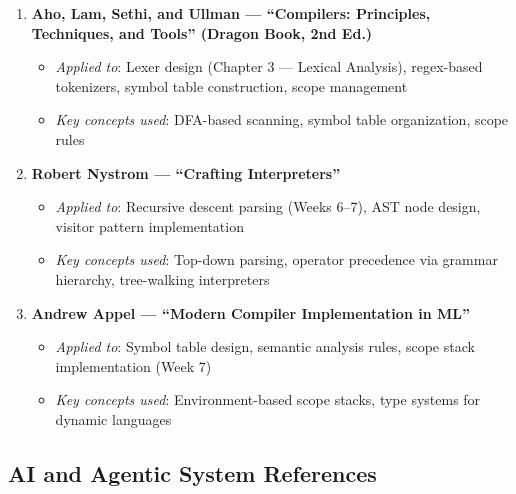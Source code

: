 \documentclass[a4paper,11pt]{article}
\begin{document}
\begin{enumerate}
    \item \textbf{Aho, Lam, Sethi, and Ullman --- ``Compilers: Principles, Techniques, and Tools'' (Dragon Book, 2nd Ed.)}
    \begin{itemize}
        \item \textit{Applied to}: Lexer design (Chapter 3 --- Lexical Analysis), regex-based tokenizers, symbol table construction, scope management
        \item \textit{Key concepts used}: DFA-based scanning, symbol table organization, scope rules
    \end{itemize}

    \item \textbf{Robert Nystrom --- ``Crafting Interpreters''}
    \begin{itemize}
        \item \textit{Applied to}: Recursive descent parsing (Weeks 6--7), AST node design, visitor pattern implementation
        \item \textit{Key concepts used}: Top-down parsing, operator precedence via grammar hierarchy, tree-walking interpreters
    \end{itemize}

    \item \textbf{Andrew Appel --- ``Modern Compiler Implementation in ML''}
    \begin{itemize}
        \item \textit{Applied to}: Symbol table design, semantic analysis rules, scope stack implementation (Week 7)
        \item \textit{Key concepts used}: Environment-based scope stacks, type systems for dynamic languages
    \end{itemize}
\end{enumerate}

\subsection{AI and Agentic System References}
\end{document}
